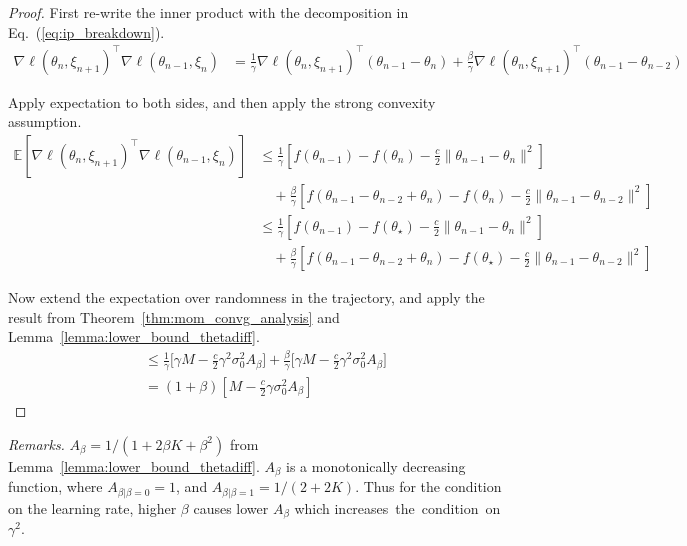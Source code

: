 \documentclass[conference]{IEEEtran}
\newcommand{\Ex}[1]{\mathbb{E}[ #1 ]}
\begin{document}
\begin{proof}
First re-write the inner product with the decomposition in Eq.~(\ref{eq:ip_breakdown}).
\begin{align*}
\nabla \ell ( \theta_n, \xi_{n+1} )^\top \nabla \ell ( \theta_{n-1}, \xi_n )
&= \frac{1}{\gamma} \nabla \ell ( \theta_n, \xi_{n+1} )^\top ( \theta_{n-1} - \theta_n ) 
+ \frac{\beta}{\gamma}  \nabla \ell ( \theta_n, \xi_{n+1} )^\top ( \theta_{n-1} - \theta_{n-2} )
\end{align*}

Apply expectation to both sides, and then apply the strong convexity assumption. 
\begin{align*}
\Ex{ \nabla \ell ( \theta_n, \xi_{n+1} )^\top \nabla \ell ( \theta_{n-1}, \xi_n ) }
&\leq \frac{1}{\gamma} [ f ( \theta_{n-1} ) - f ( \theta_n ) - \frac{c}{2} \| \theta_{n-1} - \theta_n \|^2 ] \\
&\quad + \frac{\beta}{\gamma} [ f ( \theta_{n-1} - \theta_{n-2} + \theta_n ) - f ( \theta_n ) - \frac{c}{2} \| \theta_{n-1} - \theta_{n-2} \|^2 ] \\
&\leq \frac{1}{\gamma} [ f ( \theta_{n-1} ) - f ( \theta_\star ) - \frac{c}{2} \| \theta_{n-1} - \theta_n \|^2 ] \\
&\quad+ \frac{\beta}{\gamma} [ f ( \theta_{n-1} - \theta_{n-2} + \theta_n ) - f ( \theta_\star )  - \frac{c}{2} \| \theta_{n-1} - \theta_{n-2} \|^2 ]
\end{align*}

Now extend the expectation over randomness in the trajectory, and apply the result from Theorem~\ref{thm:mom_convg_analysis} 
and Lemma~\ref{lemma:lower_bound_thetadiff}.
\begin{align*}
&\leq \frac{1}{\gamma} \bigg[ \gamma M - \frac{c}{2} \gamma^2 \sigma_0^2 A_\beta \bigg] + \frac{\beta}{\gamma} \bigg[ \gamma M - \frac{c}{2} \gamma^2 \sigma_0^2 A_\beta \bigg] \\
&= ( 1 + \beta ) [ M - \frac{c}{2} \gamma \sigma_0^2 A_\beta ] 
\end{align*}
\end{proof}

\emph{Remarks.}
$A_\beta = 1 / (1 + 2 \beta K + \beta^2)$ from  Lemma~\ref{lemma:lower_bound_thetadiff}.
$A_\beta$ is a monotonically decreasing function, where $A_{\beta | \beta=0} = 1$, and $A_{\beta | \beta=1} = 1 / (2 + 2K)$. Thus for the condition on the learning rate, higher $\beta$ causes lower $A_\beta$ which increases~the~condition~on~$\gamma^2$.\\
\end{document}
